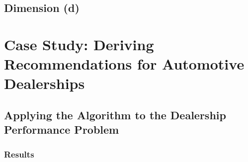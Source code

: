 \documentclass[12pt]{article}
\begin{document}
\subsection{Dimension (d)}

\section{Case Study: Deriving Recommendations for Automotive Dealerships}

\subsection{Applying the Algorithm to the Dealership Performance Problem}


\subsubsection{Results}
\end{document}
